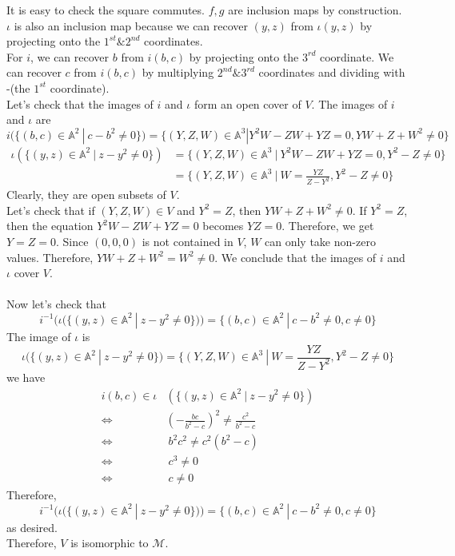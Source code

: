 \begin{example}
It is easy to check the square commutes. $f,g$ are inclusion maps by construction.
$\iota$ is also an inclusion map because we can recover $(y,z)$ from $\iota (y,z)$ by projecting onto the $1^{st}\& 2^{nd}$ coordinates. \\
For $i$, we can recover $b$ from $i(b,c)$ by projecting onto the $3^{rd}$ coordinate. We can recover $c$ from $i(b,c)$ by multiplying $2^{nd}\&3^{rd}$ coordinates and dividing with -(the $1^{st}$ coordinate). \\
Let's check that the images of $i$ and $\iota$ form an open cover of $V$. The images of $i$ and $\iota$ are
\[
	i(\{(b,c)\in \mathbb{A}^2~|~c-b^2\neq 0\})=\{(Y,Z,W)\in \mathbb{A}^3| Y^2W-ZW+YZ=0, YW+Z+W^2\neq 0\}
\]
\begin{align*}
	\iota (\{(y,z)\in \mathbb{A}^2~|~z-y^2\neq 0 \})
	&=
	\{(Y,Z,W)\in \mathbb{A}^3 ~|~ Y^2W-ZW+YZ=0,Y^2-Z\neq 0\}\\
	&=
	\{(Y,Z,W)\in \mathbb{A}^3 ~|~ W=\frac{YZ}{Z-Y^2},Y^2-Z\neq 0\}
\end{align*}
Clearly, they are open subsets of $V$.\\
Let's check that if $(Y,Z,W)\in V$ and $Y^2=Z$, then $YW+Z+W^2\neq0$. If $Y^2=Z$, then the equation $Y^2W-ZW+YZ=0$ becomes $YZ=0$. Therefore, we get $Y=Z=0$. Since $(0,0,0)$ is not contained in $V$, $W$ can only take non-zero values. Therefore, $YW+Z+W^2=W^2\neq0$. We conclude that the images of $i$ and $\iota$ cover $V$.\\
\\
Now let's check that 
\[
	i^{-1}(
	\iota (\{(y,z)\in \mathbb{A}^2~|~z-y^2\neq 0 \})
	)
		=
	\{
	(b,c)\in \mathbb{A}^2~|~
	c-b^2\neq 0,c\neq 0 	
	\}
\]
The image of $\iota$ is
\[
	\iota (\{(y,z)\in \mathbb{A}^2~|~z-y^2\neq 0 \})
	=
	\{(Y,Z,W)\in \mathbb{A}^3 ~|~ W=\frac{YZ}{Z-Y^2},Y^2-Z\neq 0\}
\]
we have
\begin{align*}
i(b,c)\in \iota &(\{(y,z)\in \mathbb{A}^2~|~z-y^2\neq 0 \})\\ \Longleftrightarrow &(-\frac{bc}{b^2-c})^2\neq \frac{c^2}{b^2-c}\\
\Longleftrightarrow & ~b^2c^2\neq c^2(b^2-c)\\
\Longleftrightarrow &~c^3\neq 0 \\
\Longleftrightarrow &~c\neq 0
\end{align*}
Therefore,
\[
	i^{-1}(
	\iota (\{(y,z)\in \mathbb{A}^2~|~z-y^2\neq 0 \})
	)
		=
	\{
	(b,c)\in \mathbb{A}^2~|~
	c-b^2\neq 0,c\neq 0 	
	\}
\]
as desired.\\
Therefore, $V$ is isomorphic to $\mathcal{M}$.
\end{example}
